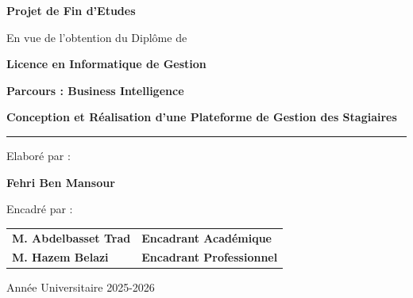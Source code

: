 \documentclass[a4paper, oneside, 12pt, final]{extreport}
\begin{document}
\begin{center}
    {\Huge\bfseries Projet de Fin d'Etudes \par}
    \vspace{0.5cm} %

    {\large En vue de l'obtention du Diplôme de \par}
    \vspace{0.5cm} %

    {\LARGE\bfseries Licence en Informatique de Gestion \par}
    \vspace{0.5cm} %

    {\LARGE\bfseries Parcours : Business Intelligence \par}
    \vspace{1.5cm} %

    {\Huge\bfseries Conception et Réalisation d'une Plateforme de Gestion des Stagiaires \par} %
    \vspace{1cm} %

    \rule{\linewidth}{3pt} %
    \vspace{0.5cm} %

    {\Large Elaboré par : \par}
    \vspace{0.5cm} %
    {\LARGE\bfseries Fehri Ben Mansour \par} %
    \vspace{1cm} %

    {\Large Encadré par : \par}
    \vspace{0.5cm} %
\end{center}
\begin{center}
\begin{tabular}{ l l }
\large\bfseries M. Abdelbasset Trad & \large\bfseries Encadrant Académique \\
\large\bfseries M. Hazem Belazi & \large\bfseries Encadrant Professionnel \\
\end{tabular}
\end{center}

\vfill %
\begin{center}
    \vspace{1.5cm}
    {\large Année Universitaire 2025-2026 \par} %
\end{center}
\end{document}
